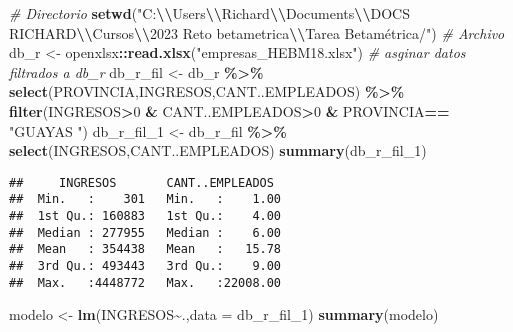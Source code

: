 \documentclass[
]{article}
\newenvironment{Shaded}{\begin{snugshade}}{\end{snugshade}}
\newcommand{\AttributeTok}[1]{\textcolor[rgb]{0.13,0.29,0.53}{#1}}
\newcommand{\CommentTok}[1]{\textcolor[rgb]{0.56,0.35,0.01}{\textit{#1}}}
\newcommand{\DecValTok}[1]{\textcolor[rgb]{0.00,0.00,0.81}{#1}}
\newcommand{\FunctionTok}[1]{\textcolor[rgb]{0.13,0.29,0.53}{\textbf{#1}}}
\newcommand{\NormalTok}[1]{#1}
\newcommand{\OtherTok}[1]{\textcolor[rgb]{0.56,0.35,0.01}{#1}}
\newcommand{\SpecialCharTok}[1]{\textcolor[rgb]{0.81,0.36,0.00}{\textbf{#1}}}
\newcommand{\StringTok}[1]{\textcolor[rgb]{0.31,0.60,0.02}{#1}}
\begin{document}
\begin{Shaded}
\begin{Highlighting}[]
\CommentTok{\# Directorio}
\FunctionTok{setwd}\NormalTok{(}\StringTok{"C:}\SpecialCharTok{\textbackslash{}\textbackslash{}}\StringTok{Users}\SpecialCharTok{\textbackslash{}\textbackslash{}}\StringTok{Richard}\SpecialCharTok{\textbackslash{}\textbackslash{}}\StringTok{Documents}\SpecialCharTok{\textbackslash{}\textbackslash{}}\StringTok{DOCS RICHARD}\SpecialCharTok{\textbackslash{}\textbackslash{}}\StringTok{Cursos}\SpecialCharTok{\textbackslash{}\textbackslash{}}\StringTok{2023 Reto betametrica}\SpecialCharTok{\textbackslash{}\textbackslash{}}\StringTok{Tarea Betamétrica/"}\NormalTok{)}
\CommentTok{\# Archivo}
\NormalTok{db\_r }\OtherTok{\textless{}{-}}\NormalTok{ openxlsx}\SpecialCharTok{::}\FunctionTok{read.xlsx}\NormalTok{(}\StringTok{"empresas\_HEBM18.xlsx"}\NormalTok{)}
\CommentTok{\# asginar datos filtrados a db\_r}
\NormalTok{db\_r\_fil }\OtherTok{\textless{}{-}}\NormalTok{ db\_r }\SpecialCharTok{\%\textgreater{}\%} 
  \FunctionTok{select}\NormalTok{(PROVINCIA,INGRESOS,CANT..EMPLEADOS) }\SpecialCharTok{\%\textgreater{}\%} 
  \FunctionTok{filter}\NormalTok{(INGRESOS}\SpecialCharTok{\textgreater{}}\DecValTok{0} \SpecialCharTok{\&}\NormalTok{ CANT..EMPLEADOS}\SpecialCharTok{\textgreater{}}\DecValTok{0} \SpecialCharTok{\&}\NormalTok{ PROVINCIA}\SpecialCharTok{==} \StringTok{"GUAYAS                                            "}\NormalTok{)}
\NormalTok{db\_r\_fil\_1 }\OtherTok{\textless{}{-}}\NormalTok{ db\_r\_fil }\SpecialCharTok{\%\textgreater{}\%} 
  \FunctionTok{select}\NormalTok{(INGRESOS,CANT..EMPLEADOS)}
\FunctionTok{summary}\NormalTok{(db\_r\_fil\_1)}
\end{Highlighting}
\end{Shaded}

\begin{verbatim}
##     INGRESOS       CANT..EMPLEADOS   
##  Min.   :    301   Min.   :    1.00  
##  1st Qu.: 160883   1st Qu.:    4.00  
##  Median : 277955   Median :    6.00  
##  Mean   : 354438   Mean   :   15.78  
##  3rd Qu.: 493443   3rd Qu.:    9.00  
##  Max.   :4448772   Max.   :22008.00
\end{verbatim}

\begin{Shaded}
\begin{Highlighting}[]
\NormalTok{modelo }\OtherTok{\textless{}{-}} \FunctionTok{lm}\NormalTok{(INGRESOS}\SpecialCharTok{\textasciitilde{}}\NormalTok{.,}\AttributeTok{data =}\NormalTok{ db\_r\_fil\_1)}
\FunctionTok{summary}\NormalTok{(modelo)}
\end{Highlighting}
\end{Shaded}
\end{document}
